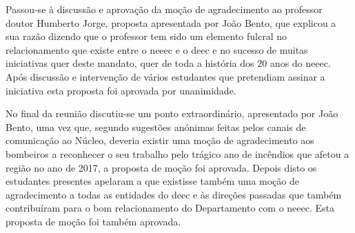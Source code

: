 Passou-se à discussão e aprovação da moção de agradecimento ao professor doutor Humberto Jorge, proposta apresentada por João Bento, que explicou a sua razão dizendo que o professor tem sido um elemento fulcral no relacionamento que existe entre o \acrshort{neeec} e o \acrshort{deec} e no sucesso de muitas iniciativas quer deste mandato, quer de toda a história dos 20 anos do \acrshort{neeec}. Após discussão e intervenção de vários estudantes que pretendiam assinar a iniciativa esta proposta foi aprovada por unanimidade.

No final da reunião discutiu-se um ponto extraordinário, apresentado por João Bento, uma vez que, segundo sugestões anónimas feitas pelos canais de comunicação ao Núcleo, deveria existir uma moção de agradecimento aos bombeiros a reconhecer o seu trabalho pelo trágico ano de incêndios que afetou a região no ano de 2017, a proposta de moção foi aprovada. Depois disto os estudantes presentes apelaram a que existisse também uma moção de agradecimento a todas as entidades do \acrshort{deec} e às direções passadas que também contribuíram para o bom relacionamento do Departamento com o \acrshort{neeec}. Esta proposta de moção foi também aprovada.